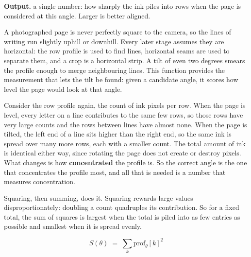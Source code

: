 \noindent\textbf{Output.} a single number: how sharply the ink piles into rows when the page is considered at this angle. Larger is better aligned.


A photographed page is never perfectly square to the camera, so the lines of writing run slightly uphill or downhill. Every later stage assumes they are horizontal: the row profile is used to find lines, horizontal seams are used to separate them, and a crop is a horizontal strip. A tilt of even two degrees smears the profile enough to merge neighbouring lines. This function provides the measurement that lets the tilt be found: given a candidate angle, it scores how level the page would look at that angle.


Consider the row profile again, the count of ink pixels per row. When the page is level, every letter on a line contributes to the same few rows, so those rows have very large counts and the rows between lines have almost none. When the page is tilted, the left end of a line sits higher than the right end, so the same ink is spread over many more rows, each with a smaller count. The total amount of ink is identical either way, since rotating the page does not create or destroy pixels. What changes is how \textbf{concentrated} the profile is. So the correct angle is the one that concentrates the profile most, and all that is needed is a number that measures concentration.


Squaring, then summing, does it. Squaring rewards large values disproportionately: doubling a count quadruples its contribution. So for a fixed total, the sum of squares is largest when the total is piled into as few entries as possible and smallest when it is spread evenly.


\begin{equation}
S(\theta) \;=\; \sum_{k} \mathrm{prof}_{\theta}[k]^{2}
\end{equation}

